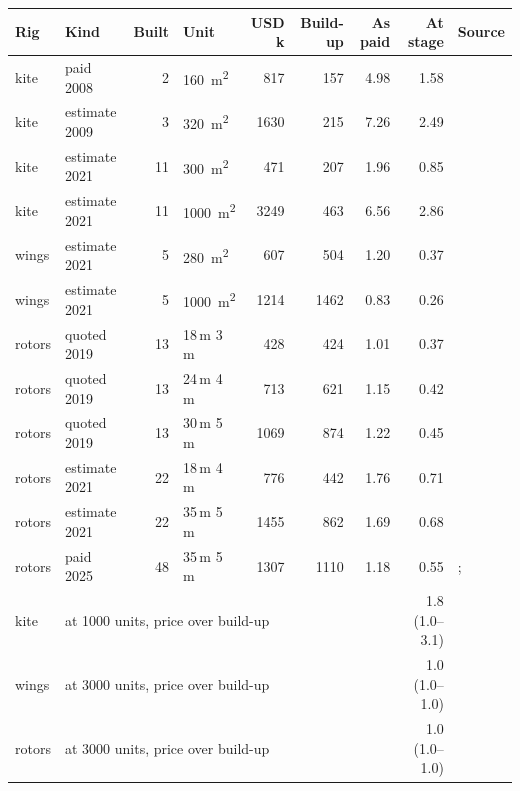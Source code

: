 \begin{tabular}{@{}llrlrrrr>{\raggedright\arraybackslash}p{3.4cm}@{}}
\toprule
Rig & Kind & Built & Unit & USD k & Build-up & As paid & At stage & Source \\
\midrule
kite & paid 2008 & \num{2} & \SI{160}{m^2} & \num{817} & \num{157} & 4.98 & 1.58 & \citealp{wiwo2008} \\
kite & estimate 2009 & \num{3} & \SI{320}{m^2} & \num{1630} & \num{215} & 7.26 & 2.49 & \citealp{wintecc2009_record} \\
kite & estimate 2021 & \num{11} & \SI{300}{m^2} & \num{471} & \num{207} & 1.96 & 0.85 & \citealp[Tables 4 and 7]{emsa2023} \\
kite & estimate 2021 & \num{11} & \SI{1000}{m^2} & \num{3249} & \num{463} & 6.56 & 2.86 & \citealp[Tables 4 and 7]{emsa2023} \\
wings & estimate 2021 & \num{5} & \SI{280}{m^2} & \num{607} & \num{504} & 1.20 & 0.37 & \citealp[Tables 4 and 7]{emsa2023} \\
wings & estimate 2021 & \num{5} & \SI{1000}{m^2} & \num{1214} & \num{1462} & 0.83 & 0.26 & \citealp[Tables 4 and 7]{emsa2023} \\
rotors & quoted 2019 & \num{13} & 18\,m \texttimes{} 3\,m & \num{428} & \num{424} & 1.01 & 0.37 & \citealp[p. 15]{tillig2020b} \\
rotors & quoted 2019 & \num{13} & 24\,m \texttimes{} 4\,m & \num{713} & \num{621} & 1.15 & 0.42 & \citealp[p. 15]{tillig2020b} \\
rotors & quoted 2019 & \num{13} & 30\,m \texttimes{} 5\,m & \num{1069} & \num{874} & 1.22 & 0.45 & \citealp[p. 15]{tillig2020b} \\
rotors & estimate 2021 & \num{22} & 18\,m \texttimes{} 4\,m & \num{776} & \num{442} & 1.76 & 0.71 & \citealp[Tables 4 and 7]{emsa2023} \\
rotors & estimate 2021 & \num{22} & 35\,m \texttimes{} 5\,m & \num{1455} & \num{862} & 1.69 & 0.68 & \citealp[Tables 4 and 7]{emsa2023} \\
rotors & paid 2025 & \num{48} & 35\,m \texttimes{} 5\,m & \num{1307} & \num{1110} & 1.18 & 0.55 & \citealp{maritimeexec2026anemoi}; \citealp{govuk2026chinavisit} \\
\midrule
kite & \multicolumn{6}{l}{at \num{1000} units, price over build-up} & 1.8 (1.0--3.1) & \\
wings & \multicolumn{6}{l}{at \num{3000} units, price over build-up} & 1.0 (1.0--1.0) & \\
rotors & \multicolumn{6}{l}{at \num{3000} units, price over build-up} & 1.0 (1.0--1.0) & \\
\bottomrule
\end{tabular}
